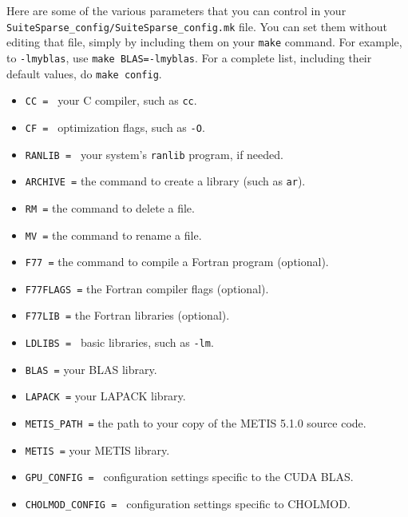 \documentclass[11pt]{article}
\begin{document}
\noindent
Here are some of the various parameters that you can control in your
{\tt SuiteSparse\_config/SuiteSparse\_config.mk} file.
You can set them without editing that file, simply by including
them on your {\tt make} command.  For example, to {\tt -lmyblas},
use {\tt make BLAS=-lmyblas}.  For a complete list, including
their default values, do {\tt make config}.
\begin{itemize}
\item {\tt CC = } your C compiler, such as {\tt cc}.
\item {\tt CF = } optimization flags, such as {\tt -O}.
\item {\tt RANLIB = } your system's {\tt ranlib} program, if needed.
\item {\tt ARCHIVE =} the command to create a library (such as {\tt ar}).
\item {\tt RM =} the command to delete a file.
\item {\tt MV =} the command to rename a file.
\item {\tt F77 =} the command to compile a Fortran program (optional).
\item {\tt F77FLAGS =} the Fortran compiler flags (optional).
\item {\tt F77LIB =} the Fortran libraries (optional).
\item {\tt LDLIBS = } basic libraries, such as {\tt -lm}.
\item {\tt BLAS =} your BLAS library.
\item {\tt LAPACK =} your LAPACK library.
\item {\tt METIS\_PATH =} the path to your copy of the METIS 5.1.0 source code.
\item {\tt METIS =} your METIS library.
\item {\tt GPU\_CONFIG = } configuration settings specific to the CUDA BLAS.
\item {\tt CHOLMOD\_CONFIG = } configuration settings specific to CHOLMOD.
\end{itemize}
\end{document}

